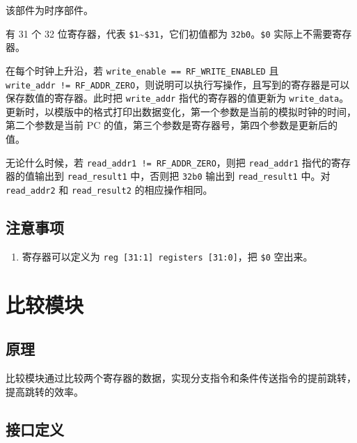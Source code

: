 \documentclass[12pt,AutoFakeBold,AutoFakeSlant]{article}
\providecommand{\tightlist}{%
  \setlength{\itemsep}{0pt}\setlength{\parskip}{0pt}}
\begin{document}
该部件为时序部件。

有 31 个 32 位寄存器，代表
\texttt{\$1}\textasciitilde{}\texttt{\$31}，它们初值都为
\texttt{32\textquotesingle{}b0}。\texttt{\$0} 实际上不需要寄存器。

在每个时钟上升沿，若 \texttt{write\_enable\ ==\ RF\_WRITE\_ENABLED} 且
\texttt{write\_addr\ !=\ RF\_ADDR\_ZERO}，则说明可以执行写操作，且写到的寄存器是可以保存数值的寄存器。此时把
\texttt{write\_addr} 指代的寄存器的值更新为
\texttt{write\_data}。更新时，以模版中的格式打印出数据变化，第一个参数是当前的模拟时钟的时间，第二个参数是当前
PC 的值，第三个参数是寄存器号，第四个参数是更新后的值。

无论什么时候，若 \texttt{read\_addr1\ !=\ RF\_ADDR\_ZERO}，则把
\texttt{read\_addr1} 指代的寄存器的值输出到 \texttt{read\_result1}
中，否则把 \texttt{32\textquotesingle{}b0} 输出到 \texttt{read\_result1}
中。对 \texttt{read\_addr2} 和 \texttt{read\_result2} 的相应操作相同。

\hypertarget{ux6ce8ux610fux4e8bux9879-3}{%
\subsection{注意事项}\label{ux6ce8ux610fux4e8bux9879-3}}

\begin{enumerate}
\def\labelenumi{\arabic{enumi}.}
\tightlist
\item
  寄存器可以定义为 \texttt{reg\ {[}31:1{]}\ registers\ {[}31:0{]}}，把
  \texttt{\$0} 空出来。
\end{enumerate}

\hypertarget{ux6bd4ux8f83ux6a21ux5757}{%
\section{比较模块}\label{ux6bd4ux8f83ux6a21ux5757}}

\hypertarget{ux539fux7406-4}{%
\subsection{原理}\label{ux539fux7406-4}}

比较模块通过比较两个寄存器的数据，实现分支指令和条件传送指令的提前跳转，提高跳转的效率。

\hypertarget{ux63a5ux53e3ux5b9aux4e49-1}{%
\subsection{接口定义}\label{ux63a5ux53e3ux5b9aux4e49-1}}
\end{document}
